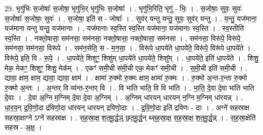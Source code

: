 \documentclass[17pt]{extarticle}
\begin{document}
29. भृगु॑भिः स॒जोषाः᳚ स॒जोषा॒ भृगु॑भि॒र् भृगु॑भिः स॒जोषाः᳚ । . भृगु॑भि॒रिति॒ भृगु॑ - भिः॒ । . स॒जोषाः॒ सुवः॒ सुवः॑ स॒जोषाः᳚ स॒जोषाः॒ सुवः॑ । . स॒जोषा॒ इति॑ स - जोषाः᳚ । . सुव॑र् यन्तु यन्तु॒ सुवः॒ सुव॑र् यन्तु । . य॒न्तु॒ यज॑माना॒ यज॑माना यन्तु यन्तु॒ यज॑मानाः । . यज॑मानाः स्व॒स्ति स्व॒स्ति यज॑माना॒ यज॑मानाः स्व॒स्ति । . स्व॒स्तीति॑ स्व॒स्ति । . नक्तो॒षासा॒ सम॑नसा॒ सम॑नसा॒ नक्तो॒षासा॒ नक्तो॒षासा॒ सम॑नसा । . सम॑नसा॒ विरू॑पे॒ विरू॑पे॒ सम॑नसा॒ सम॑नसा॒ विरू॑पे । . सम॑न॒सेति॒ स - म॒न॒सा॒ । . विरू॑पे धा॒पये॑ते धा॒पये॑ते॒ विरू॑पे॒ विरू॑पे धा॒पये॑ते । . विरू॑पे॒ इति॒ वि - रू॒पे॒ । . धा॒पये॑ते॒ शिशुꣳ॒॒ शिशु॑म् धा॒पये॑ते धा॒पये॑ते॒ शिशु᳚म् । . धा॒पये॑ते॒ इति॑ धा॒पये॑ते । . शिशु॒ मेक॒ मेकꣳ॒॒ शिशुꣳ॒॒ शिशु॒ मेक᳚म् । . एकꣳ॑ समी॒ची स॑मी॒ची एक॒ मेकꣳ॑ समी॒ची । . स॒मी॒ची इति॑ समी॒ची । . द्यावा॒ क्षाम॒ क्षाम॒ द्यावा॒ द्यावा॒ क्षाम॑ । . क्षामा॑ रु॒क्मो रु॒क्मः क्षाम॒ क्षामा॑ रु॒क्मः । . रु॒क्मो अ॒न्त-र॒न्ता रु॒क्मो रु॒क्मो अ॒न्तः । . अ॒न्तर् वि व्य॑न्त-र॒न्तर् वि । . वि भा॑ति भाति॒ वि वि भा॑ति । . भा॒ति॒ दे॒वा दे॒वा भा॑ति भाति दे॒वाः । . दे॒वा अ॒ग्नि म॒ग्निम् दे॒वा दे॒वा अ॒ग्निम् । . अ॒ग्निम् धा॑रयन् धारयन् न॒ग्नि म॒ग्निम् धा॑रयन्न् । . धा॒र॒य॒न् द्र॒वि॒णो॒दा द्र॑विणो॒दा धा॑रयन् धारयन् द्रविणो॒दाः । . द्र॒वि॒णो॒दा इति॑ द्रविणः - दाः । . अग्ने॑ सहस्राक्ष सहस्रा॒क्षाग्ने ऽग्ने॑ सहस्राक्ष । . स॒ह॒स्रा॒क्ष॒ श॒त॒मू॒र्द्ध॒ञ्॒ छ॒त॒मू॒र्द्ध॒न् थ्स॒ह॒स्रा॒क्ष॒ स॒ह॒स्रा॒क्ष॒ श॒त॒मू॒र्द्ध॒न्न् । . स॒ह॒स्रा॒क्षेति॑ सहस्र - अ॒क्ष॒ । \newline
\end{document}
